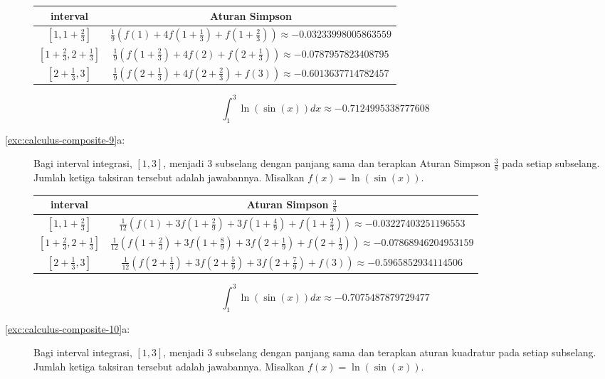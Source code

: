 \begin{description}
\begin{center}
\begin{tabular}{cc}
interval & Aturan Simpson\tabularnewline
\hline 
$[1,1+\frac{2}{3}]$ & $\frac{1}{9}\left(f(1)+4f(1+\frac{1}{3})+f(1+\frac{2}{3})\right)\approx-0.03233998005863559$\tabularnewline
$[1+\frac{2}{3},2+\frac{1}{3}]$ & $\frac{1}{9}\left(f(1+\frac{2}{3})+4f(2)+f(2+\frac{1}{3})\right)\approx-0.0787957823408795$\tabularnewline
$[2+\frac{1}{3},3]$ & $\frac{1}{9}\left(f(2+\frac{1}{3})+4f(2+\frac{2}{3})+f(3)\right)\approx-0.6013637714782457$\tabularnewline
\end{tabular}
\par\end{center}

\begin{center}
\[
\int_{1}^{3}\ln(\sin(x))dx\approx-0.7124995338777608
\]
\par\end{center}
\item [{\ref{exc:calculus-composite-9}a:}] Bagi interval integrasi, $[1,3]$,
menjadi 3 subselang dengan panjang sama dan terapkan Aturan Simpson
$\frac{3}{8}$ pada setiap subselang. Jumlah ketiga taksiran tersebut
adalah jawabannya. Misalkan $f(x)=\ln(\sin(x))$.

\begin{center}
\begin{tabular}{cc}
interval & Aturan Simpson $\frac{3}{8}$\tabularnewline
\hline 
$[1,1+\frac{2}{3}]$ & $\frac{1}{12}\left(f(1)+3f(1+\frac{2}{9})+3f(1+\frac{4}{9})+f(1+\frac{2}{3})\right)\approx-0.03227403251196553$\tabularnewline
$[1+\frac{2}{3},2+\frac{1}{3}]$ & $\frac{1}{12}\left(f(1+\frac{2}{3})+3f(1+\frac{8}{9})+3f(2+\frac{1}{9})+f(2+\frac{1}{3})\right)\approx-0.07868946204953159$\tabularnewline
$[2+\frac{1}{3},3]$ & $\frac{1}{12}\left(f(2+\frac{1}{3})+3f(2+\frac{5}{9})+3f(2+\frac{7}{9})+f(3)\right)\approx-0.5965852934114506$\tabularnewline
\end{tabular}
\par\end{center}

\begin{center}
\[
\int_{1}^{3}\ln(\sin(x))dx\approx-0.7075487879729477
\]
\par\end{center}
\item [{\ref{exc:calculus-composite-10}a:}] Bagi interval integrasi, $[1,3]$,
menjadi 3 subselang dengan panjang sama dan terapkan aturan kuadratur
pada setiap subselang. Jumlah ketiga taksiran tersebut adalah jawabannya.
Misalkan $f(x)=\ln(\sin(x))$.


\end{description}
